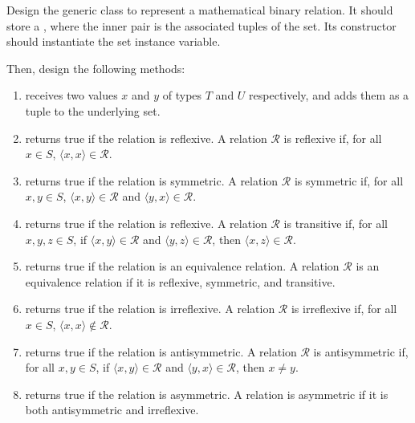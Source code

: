 Design the generic  class to represent a mathematical binary relation. It should store a , where the inner pair is the associated tuples of the set. Its constructor should instantiate the set instance variable. 

Then, design the following methods:

\begin{enumerate}[label=(\alph*)]
    \item {} receives two values $x$ and $y$ of types $T$ and $U$ respectively, and adds them as a tuple to the underlying set.
    
    \item {} returns true if the relation is reflexive. A relation $\mathcal{R}$ is reflexive if, for all $x \in S$, $\langle{x, x}\rangle \in \mathcal{R}$.
    
    \item {} returns true if the relation is symmetric. A relation $\mathcal{R}$ is symmetric if, for all $x, y \in S$, $\langle{x, y}\rangle \in \mathcal{R}$ and $\langle{y, x}\rangle \in \mathcal{R}$.
    
    \item {} returns true if the relation is reflexive. A relation $\mathcal{R}$ is transitive if, for all $x, y, z \in S$, if $\langle{x, y}\rangle \in \mathcal{R}$ and $\langle{y, z}\rangle \in \mathcal{R}$, then $\langle{x, z}\rangle \in \mathcal{R}$.
    
    \item {} returns true if the relation is an equivalence relation. A relation $\mathcal{R}$ is an equivalence relation if it is reflexive, symmetric, and transitive.

    \item {} returns true if the relation is irreflexive. A relation $\mathcal{R}$ is irreflexive if, for all $x \in S$, $\langle{x, x}\rangle \not\in \mathcal{R}$.
    
    \item {} returns true if the relation is antisymmetric. A relation $\mathcal{R}$ is antisymmetric if, for all $x, y \in S$, if $\langle{x, y}\rangle \in \mathcal{R}$ and $\langle{y, x}\rangle \in \mathcal{R}$, then $x \neq y$.
    
    \item {} returns true if the relation is asymmetric. A relation is asymmetric if it is both antisymmetric and irreflexive.


\end{enumerate}
